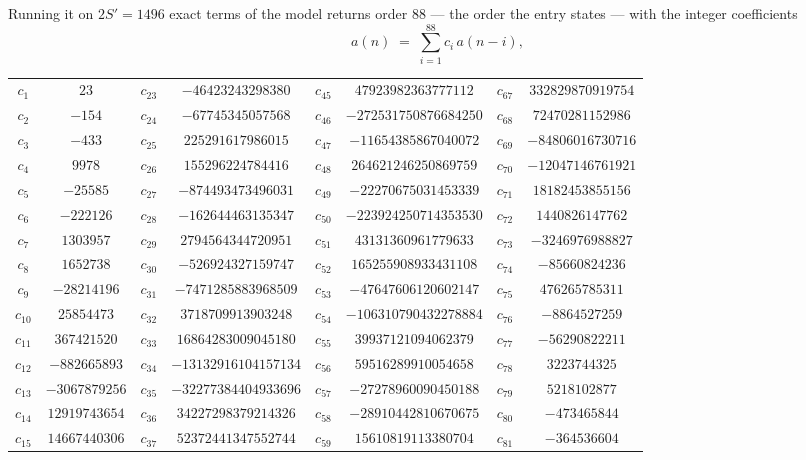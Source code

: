 \documentclass[11pt,a4paper]{article}
\theoremstyle{plain}
\theoremstyle{definition}
\begin{document}
Running it on $2S'=1496$ exact terms of the model returns order $88$ --- the order the
entry states --- with the integer coefficients
\[
a(n)\;=\;\sum_{i=1}^{88}c_i\,a(n-i),
\]
\begin{center}\small
\begin{tabular}{cccccccc}
$c_{1}$ & $23$ & $c_{23}$ & $-46423243298380$ & $c_{45}$ & $47923982363777112$ & $c_{67}$ & $332829870919754$ \\
$c_{2}$ & $-154$ & $c_{24}$ & $-67745345057568$ & $c_{46}$ & $-272531750876684250$ & $c_{68}$ & $72470281152986$ \\
$c_{3}$ & $-433$ & $c_{25}$ & $225291617986015$ & $c_{47}$ & $-11654385867040072$ & $c_{69}$ & $-84806016730716$ \\
$c_{4}$ & $9978$ & $c_{26}$ & $155296224784416$ & $c_{48}$ & $264621246250869759$ & $c_{70}$ & $-12047146761921$ \\
$c_{5}$ & $-25585$ & $c_{27}$ & $-874493473496031$ & $c_{49}$ & $-22270675031453339$ & $c_{71}$ & $18182453855156$ \\
$c_{6}$ & $-222126$ & $c_{28}$ & $-162644463135347$ & $c_{50}$ & $-223924250714353530$ & $c_{72}$ & $1440826147762$ \\
$c_{7}$ & $1303957$ & $c_{29}$ & $2794564344720951$ & $c_{51}$ & $43131360961779633$ & $c_{73}$ & $-3246976988827$ \\
$c_{8}$ & $1652738$ & $c_{30}$ & $-526924327159747$ & $c_{52}$ & $165255908933431108$ & $c_{74}$ & $-85660824236$ \\
$c_{9}$ & $-28214196$ & $c_{31}$ & $-7471285883968509$ & $c_{53}$ & $-47647606120602147$ & $c_{75}$ & $476265785311$ \\
$c_{10}$ & $25854473$ & $c_{32}$ & $3718709913903248$ & $c_{54}$ & $-106310790432278884$ & $c_{76}$ & $-8864527259$ \\
$c_{11}$ & $367421520$ & $c_{33}$ & $16864283009045180$ & $c_{55}$ & $39937121094062379$ & $c_{77}$ & $-56290822211$ \\
$c_{12}$ & $-882665893$ & $c_{34}$ & $-13132916104157134$ & $c_{56}$ & $59516289910054658$ & $c_{78}$ & $3223744325$ \\
$c_{13}$ & $-3067879256$ & $c_{35}$ & $-32277384404933696$ & $c_{57}$ & $-27278960090450188$ & $c_{79}$ & $5218102877$ \\
$c_{14}$ & $12919743654$ & $c_{36}$ & $34227298379214326$ & $c_{58}$ & $-28910442810670675$ & $c_{80}$ & $-473465844$ \\
$c_{15}$ & $14667440306$ & $c_{37}$ & $52372441347552744$ & $c_{59}$ & $15610819113380704$ & $c_{81}$ & $-364536604$ \\

\end{tabular}
\end{center}
\end{document}
